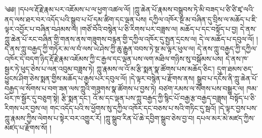 \setcounter{footnote}{0} 
༄༅། །དཔལ་རྡོ་རྗེ་རྣམ་པར་འཇོམས་པ་ལ་ཕྱག་འཚལ་ལོ། །ཀླུ་ཆེན་པོ་རྣམས་བསྒྲུབས་ཏེ་མི་བཟད་པ་ཙི་ཙི་ཛྭ་ལའི་ནད་ལས་ཐར་བར་འདོད་པའི་སྒྲུབ་པ་པོ་དམ་ཚིག་དང་ལྡན་པས། དཀྱིལ་འཁོར་སྔ་མ་བཞིན་དུ་བྲིས་ལ་མཆོད་པ་ཇི་ལྟར་འབྱོར་པ་བཞིན་བཤམས་ལ། །གཙོ་བོའི་བསྙེན་པ་ཅི་རིགས་པར་བཟླས་ལ། མཆོད་པ་དང་བསྟོད་པ་བྱ། དེ་ནས་ཀླུ་ཆེན་པོ་རང་བཞིན་གྱི་གནས་ནས་གཟུགས་བརྙན་གྱི་དཀྱིལ་འཁོར་དུ་སྤྱན་དྲངས་ལ། དེ་ལ་མཆོད་པ་དབུལ་ལོ། །དེ་ནས་ཀླུ་བརྒྱད་ཀྱི་གཏོར་མ་ལ་བཾ་ལས་ཡེ་ཤེས་ཀྱི་ཆུ་རྒྱུན་བབས་ཏེ་སྔ་མ་ལྟར་ཕུལ་ལ། དེ་ནས་ཀླུ་བརྒྱད་ཀྱི་དཀྱིལ་འཁོར་དེ་བདག་ཉིད་རྡོ་རྗེ་རྣམ་འཇོམས་ཀྱི་ང་རྒྱལ་དང་ལྡན་པས་ལག་མཐིལ་གཉིས་སུ་བསྒོམས་པས། དེ་ནས་ཁ་སྦྱར་ཏེ་ཕུད་ཅེས་པ་ལན་འབུམ་བཟླས་ཏེ། ཀླུ་རྣམས་ལ་འོ་མ་རྩི་སྨན་སྣ་ཚོགས་པས་མཆོད་ཅིང་། དུག་ཐམས་ཅད་ཕྱུངས་ཤིག་ཅེས་སྨན་གྱིས་མཆོད་པ་རྒྱས་པར་དབུལ་ལོ། །དེ་ལྟར་བསྙེན་པ་རྫོགས་ནས། སྒྲུབ་པ་དངོས་ནི་ཀླུ་ཆེན་པོ་བརྒྱད་ལ་སོགས་པ་བག་ཟན་ལས་ཀླུའི་གཟུགས་སྣ་ཚོགས་པ་བྱས་ཏེ། བཙག་རམས་ལ་སོགས་པས་བསྒྱུར་ལ། ཁམ་ཕོར་ཁ་སྦྱོར་དུ་བཅུག་སྟེ། རྩི་སྨན་དང་། འོ་མ་དང་ལྡན་པས་ཀླུ་བརྒྱད་ཀྱི་སྙིང་པོ་བརྒྱ་རྩ་བརྒྱད་བཟླས། བསྟོད་པ་ཅི་རིགས་པར་བྱས་ལ། གང་འདོད་པའི་ས་ཕྱོགས་སུ་དཀྱིལ་འཁོར་དང་བཅས་པ་སའི་གཏིང་དུ་སྦའོ། །དེ་ལྟར་བྱས་པས་ཀླུ་རྣམས་ཀྱིས་ལེགས་པ་སྟེར་བར་འགྱུར་རོ། །ཀླུ་སྒྲུབ་རིན་པོ་ཆེ་དབྱིག་སྒྲུབ་ཅེས་བྱ་བ། དཔལ་མར་མེ་མཛད་ཀྱིས་མཛད་པ་རྫོགས་སོ། །